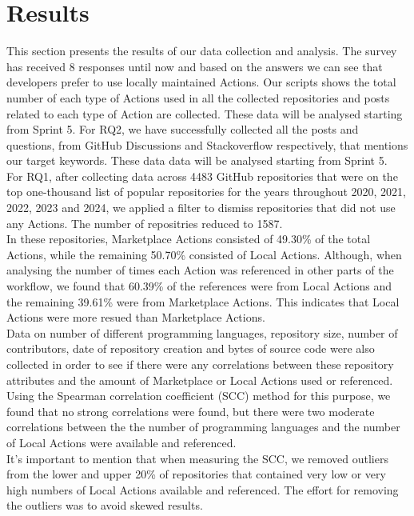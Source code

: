 \documentclass[conference]{IEEEtran}
\begin{document}

\section{Results}
    This section presents the results of our data collection and analysis.
    The survey has received 8 responses until now and based on the answers we can see that developers prefer to use locally maintained Actions. Our scripts shows the total number of each type of Actions used in all the collected repositories and posts related to each type of Action are collected. These data will be analysed starting from Sprint 5.
    For RQ2, we have successfully collected all the posts and questions, from GitHub Discussions and Stackoverflow respectively, that mentions our target keywords. These data data will be analysed starting from Sprint 5.
    \\

    For RQ1, after collecting data across 4483 GitHub repositories that were on the top one-thousand list of popular repositories for the years throughout 2020, 2021, 2022, 2023 and 2024, we applied a filter to dismiss repositories that did not use any Actions. The number of repositries reduced to 1587. \\ 
    In these repositories, Marketplace Actions consisted of 49.30\% of the total Actions, while the remaining 50.70\% consisted of Local Actions. Although, when analysing the number of times each Action was referenced in other parts of the workflow, we found that 60.39\% of the references were from Local Actions and the remaining 39.61\% were from Marketplace Actions. This indicates that Local Actions were more resued than Marketplace Actions. 
    \\

    Data on number of different programming languages, repository size, number of contributors, date of repository creation and bytes of source code were also collected in order to see if there were any correlations between these repository attributes and the amount of Marketplace or Local Actions used or referenced.\\
    Using the Spearman correlation coefficient (SCC) method for this purpose, we found that no strong correlations were found, but there were two moderate correlations between the the number of programming languages and the number of Local Actions were available and referenced. \\
    It's important to mention that when measuring the SCC, we removed outliers from the lower and upper 20\% of repositories that contained very low or very high numbers of Local Actions available and referenced. The effort for removing the outliers was to avoid skewed results. \\
\end{document}
